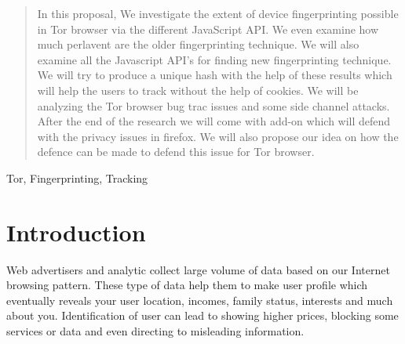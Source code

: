 \documentclass[conference]{IEEEtran}
\begin{document}
\begin{abstract}
In this proposal, We investigate the extent of device fingerprinting possible in Tor browser via the different JavaScript API. We even examine how much perlavent are the older fingerprinting technique. We will also examine all the Javascript API's for finding new fingerprinting technique. We will try to produce a unique hash with the help of these results which will help the users to track without the help of cookies. We will be analyzing the Tor browser bug trac issues and some side channel attacks. After the end of the research we will come with add-on which will defend with the privacy issues in firefox. We will also propose our idea on how the defence can be made to defend this issue for Tor browser.
\end{abstract}

\begin{IEEEkeywords}
Tor, Fingerprinting, Tracking
\end{IEEEkeywords}






%
\IEEEpeerreviewmaketitle



\section{Introduction}
Web advertisers and analytic collect large volume of data based on our Internet browsing pattern. These type of data help them to make user profile which eventually reveals your user location, incomes, family status, interests and much about you. Identification of user can lead to showing higher prices, blocking some services or data and even directing to misleading information.
\end{document}
